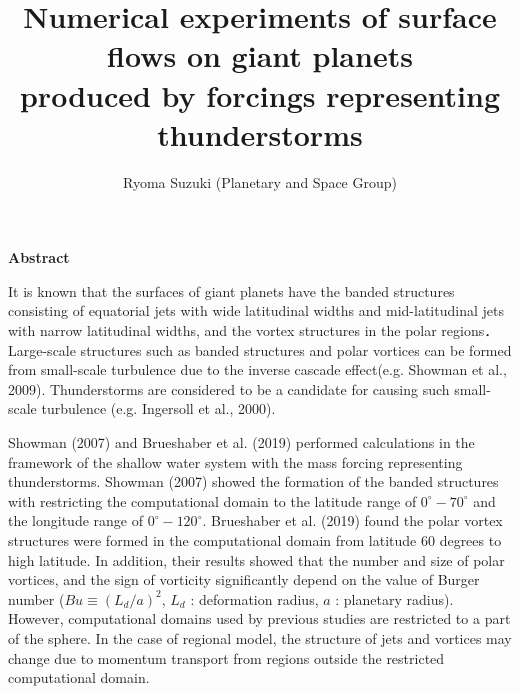 \documentclass[a4j,8pt]{jarticle}
\begin{document}
\pagestyle{empty} 
\title{\Large 
Numerical experiments of surface flows on giant planets \\
produced by forcings representing thunderstorms
}

\author{\large Ryoma Suzuki (Planetary and Space Group)}
\date{}
\maketitle
\begin{center}
\bf \large Abstract
\end{center}
%
It is known that the surfaces of giant planets 
have the banded structures consisting of 
equatorial jets with wide latitudinal widths
and mid-latitudinal jets with narrow latitudinal widths, 
and the vortex structures in the polar regions．
Large-scale structures such as banded structures 
and polar vortices can be formed from small-scale turbulence 
due to the inverse cascade effect(e.g. Showman et al., 2009).
Thunderstorms are considered to be a candidate for 
causing such small-scale turbulence (e.g. Ingersoll et al., 2000).

Showman (2007) and Brueshaber et al. (2019) performed calculations 
in the framework of the shallow water system with 
the mass forcing representing thunderstorms.
Showman (2007) showed the formation of the banded structures
with restricting the computational domain to the latitude range of
$0^\circ - 70^\circ$ and the longitude range of $0^\circ - 120^\circ$.
Brueshaber et al. (2019) found the polar vortex structures were formed
in the computational domain from latitude 60 degrees to high latitude.
In addition, their results showed that the number and size of polar vortices, 
and the sign of vorticity significantly depend on the value of 
Burger number ($Bu \equiv (L_d/a)^2$, $L_d$ : deformation radius, $a$ : planetary radius).
However, computational domains used by previous studies 
are restricted to a part of the sphere.
In the case of regional model, the structure of jets and vortices 
may change due to momentum transport from
regions outside the restricted computational domain.
\end{document}
